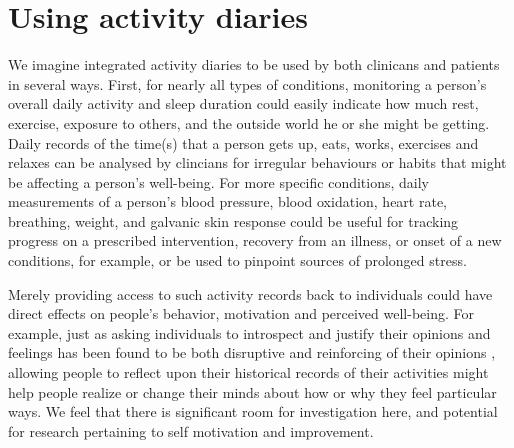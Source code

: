 \documentclass{chi-ext}
\begin{document}
\section{Using activity diaries}

We imagine integrated activity diaries to be used by both clinicans
and patients in several ways.  First, for nearly all types of
conditions, monitoring a person's overall daily activity and sleep
duration could easily indicate how much rest, exercise, exposure to
others, and the outside world he or she might be getting.  Daily
records of the time(s) that a person gets up, eats, works, exercises
and relaxes can be analysed by clincians for irregular behaviours or
habits that might be affecting a person's well-being. For more
specific conditions, daily measurements of a person's blood pressure,
blood oxidation, heart rate, breathing, weight, and galvanic skin
response could be useful for tracking progress on a prescribed
intervention, recovery from an illness, or onset of a new conditions,
for example, or be used to pinpoint sources of prolonged stress.

Merely providing access to such activity records back to individuals
could have direct effects on people's behavior, motivation and
perceived well-being.  For example, just as asking individuals to
introspect and justify their opinions and feelings has been found to
be both disruptive and reinforcing of their opinions
\cite{wilson1989introspection}, allowing people to reflect upon their
historical records of their activities might help people realize or
change their minds about how or why they feel particular ways. We feel
that there is significant room for investigation here, and potential
for research pertaining to self motivation and improvement.
\end{document}

